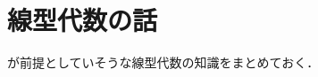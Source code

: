 \documentclass[rep_main]{subfiles}
\begin{document}
\chapter{線型代数の話}

\cite{Humphreys1972introduction}が前提としていそうな線型代数の知識をまとめておく．


\end{document}
